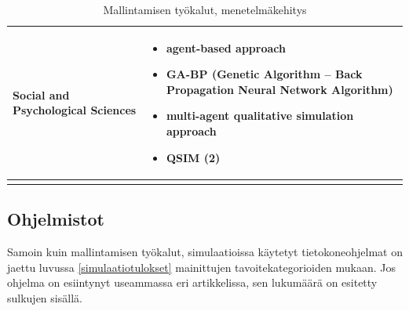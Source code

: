 \documentclass[utf8]{gradu3}
\begin{document}
\begin{longtable}[h]{|p{5cm}|p{8cm}|}
    \hline
        Social and Psychological Sciences & \begin{itemize}
        \item agent-based approach
        \item GA-BP (Genetic Algorithm – Back Propagation Neural Network Algorithm)
        \item multi-agent qualitative simulation approach
        \item QSIM (2)
    \end{itemize} \\
    \hline
    \caption{Mallintamisen työkalut, menetelmäkehitys}
    \label{table:mallintaminen 3.}
\end{longtable}


\subsection{Ohjelmistot}
Samoin kuin mallintamisen työkalut, simulaatioissa käytetyt
tietokoneohjelmat on jaettu luvussa \ref{simulaatiotulokset} 
mainittujen tavoitekategorioiden mukaan. Jos ohjelma on esiintynyt useammassa eri 
artikkelissa, sen lukumäärä on esitetty sulkujen sisällä.
\end{document}
